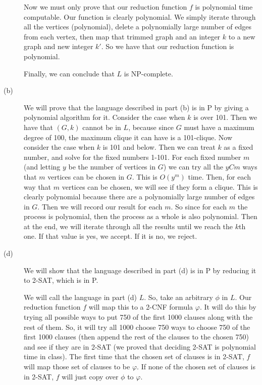 \documentclass{article}
\begin{document}
\begin{description}
        Now we must only prove that our reduction function $f$ is polynomial
        time computable. Our function is clearly polynomial. We simply iterate
        through all the vertices (polynomial), delete a polynomially large
        number of edges from each vertex, then map that trimmed graph and an
        integer $k$ to a new graph and new integer $k'$. So we have that our
        reduction function is polynomial.

        Finally, we can conclude that $L$ is NP-complete.
    \item[(b)]
        We will prove that the language described in part (b) is in P by
        giving a polynomial algorithm for it. Consider the case when $k$ is over
        101. Then we have that $(G,k)$ cannot be in $L$, because since $G$ must
        have a maximum degree of 100, the maximum clique it can have is a
        101-clique. Now consider the case when $k$ is 101 and below. Then we
        can treat $k$ as a fixed number, and solve for the fixed numbers 1-101.
        For each fixed number $m$ (and letting $y$ be the number of vertices in
        $G$) we can try all the $yCm$ ways that $m$ vertices can be chosen in
        $G$. This is $O(y^m)$ time. Then, for each way that $m$ vertices can be
        chosen, we will see if they form a clique. This is clearly polynomial
        because there are a polynomially large number of edges in $G$. Then
        we will record our result for each $m$. So since for each $m$ the
        process is polynomial, then the process as a whole is also polynomial.
        Then at the end, we will iterate
        through all the results until we reach the $k$th one. If that value
        is yes, we accept. If it is no, we reject.
    \item[(d)]
        We will show that the language described in part (d) is in P by
        reducing it to 2-SAT, which is in P.

        We will call the language in part (d) $L$. So, take an arbitrary
        $\phi$ in $L$. Our reduction function $f$ will map this to a 2-CNF
        formula $\varphi$. It will do this by trying all possible ways to put
        750 of the first 1000 clauses along with the rest of them. So, it will
        try all 1000 choose 750 ways to choose 750 of the first 1000 clauses
        (then append the rest of the clauses to the chosen 750)
        and see if they are in 2-SAT (we proved that deciding 2-SAT is polynomial
        time in class). The first time that the chosen set of clauses is in
        2-SAT, $f$ will map those set of clauses to be $\varphi$. If none of
        the chosen set of clauses is in 2-SAT,
        $f$ will just copy over $\phi$ to $\varphi$.


\end{description}
\end{document}
